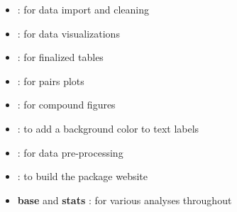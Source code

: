 \begin{itemize}
\tightlist
\item
   \citep{wickham_welcome_2019}: for data import and
  cleaning
\item
   \citep{wickham_ggplot2_2016}: for data
  visualizations
\item
   \citep{zhu_kableextra_2019}: for finalized tables
\item
   \citep{schloerke_ggally_2020}: for pairs plots
\item
   \citep{pedersen_patchwork_2019}: for compound
  figures
\item
   \citep{yu_shadowtext_2019}: to add a background
  color to text labels
\item
   \citep{kuhn_recipes_2020}: for data pre-processing
\item
   \citep{wickham_pkgdown_2020}: to build the package
  website
\item
  \textbf{base} and \textbf{stats} \citep{r_core_team_r_2019}: for
  various analyses throughout
\end{itemize}



\address{%
Allison M. Horst\\
University of California Santa Barbara\\%
Bren School of Environmental Science and Management\\ Santa Barbara, CA
93106-5131\\
%
%
%
\href{mailto:ahorst@ucsb.edu}{\nolinkurl{ahorst@ucsb.edu}}%
}

\address{%
Alison Presmanes Hill\\
AI Strategy \& Innovation, IBM\\%
\\
%
%
%
\href{mailto:apreshill@gmail.com}{\nolinkurl{apreshill@gmail.com}}%
}

\address{%
Kristen B. Gorman\\
University of Alaska Fairbanks\\%
College of Fisheries and Ocean Sciences\\ 2150 Koyukuk Drive\\ 245
O'Neill Building\\ Fairbanks, AK 99775-7220\\
%
%
%
\href{mailto:kbgorman@alaska.edu}{\nolinkurl{kbgorman@alaska.edu}}%
}
